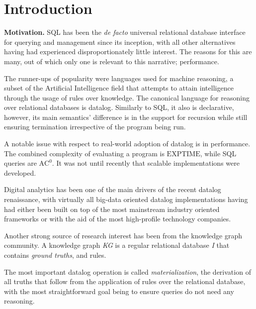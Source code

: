 \documentclass[manuscript,screen,review]{acmart}
\theoremstyle{definition}
\begin{document}

\maketitle

\section{Introduction}
\textbf{Motivation.} SQL has been the \textit{de facto} universal relational
database interface for querying and management since its inception,
with all other alternatives having had experienced disproportionately
little interest. The reasons for this are many, out of which only one
is relevant to this narrative; performance.

The runner-ups of popularity were languages used for machine reasoning,
a subset of the Artificial Intelligence field that attempts to attain
intelligence through the usage of rules over knowledge. The canonical
language for reasoning over relational databases is datalog\cite{datalog}.
Similarly to SQL, it also is declarative, however, its main semantics' difference
is in the support for recursion while still ensuring termination irrespective
of the program being run.

A notable issue with respect to real-world adoption of datalog is in
performance. The combined complexity of evaluating a program is
$\text{EXPTIME}$\cite{datalog}, while SQL queries are $\text{AC}^0$. It was
not until recently\cite{rdfox} that scalable implementations were
developed.

Digital analytics has been one of the main drivers of the recent datalog renaissance,
with virtually all big-data oriented datalog implementations having had either been built
on top of the most mainstream industry oriented frameworks\cite{bigdatalog,cog,cog2} or with the
aid of the most high-profile technology companies\cite{logica,yedalog,vadalog}.

Another strong source of research interest has been from the knowledge graph community. A
knowledge graph \textit{KG} is a regular relational database \textit{I} that contains
\textit{ground truths}, and rules.

The most important datalog operation is called \textit{materialization}, the derivation of all
truths that follow from the application of rules over the relational database, with the most
straightforward goal being to ensure queries do not need any reasoning.
\end{document}
